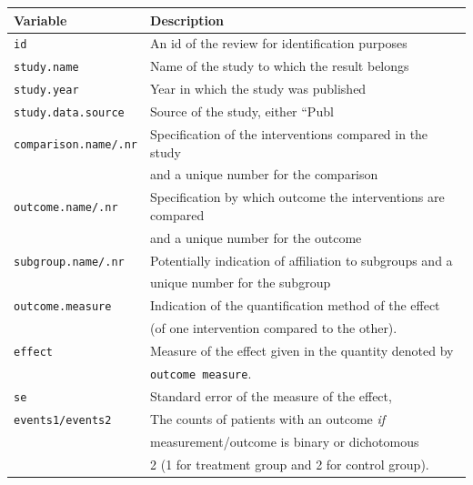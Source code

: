 \documentclass[11pt,a4paper,twoside]{book}\usepackage[]{graphicx}\usepackage[]{color}
\begin{document}
\begin{table}[ht]
  \begin{center}
    \begin{tabular}{l l}
      \textbf{Variable} & \textbf{Description}\\
      \hline
      \texttt{id} & An id of the review for identification purposes \\
      \hline
      \texttt{study.name} & Name of the study to which the result belongs\\
      \texttt{study.year} & Year in which the study was published \\
      \texttt{study.data.source} & Source of the study, either ``Publ \\
      \hline
      \texttt{comparison.name/.nr} & Specification of the interventions compared in the study  \\ &and a unique number for the comparison\\
      \texttt{outcome.name/.nr} & Specification by which outcome the interventions are compared\\ &and a unique number for the outcome\\
      \texttt{subgroup.name/.nr} & Potentially indication of affiliation to subgroups and a \\ &unique number for the subgroup\\
      \texttt{outcome.measure} & Indication of the quantification method of the effect \\ &(of one intervention compared to the other).\\
      \texttt{effect} & Measure of the effect given in the quantity denoted by \\ &\texttt{outcome measure}.\\
      \texttt{se} & Standard error of the measure of the effect,\\
      \texttt{events1/events2} & The counts of patients with an outcome \textit{if}\\ &measurement/outcome is binary or dichotomous \\ &2 (1 for treatment group and 2 for control group).\\

\end{tabular}
\end{center}
\end{table}
\end{document}
